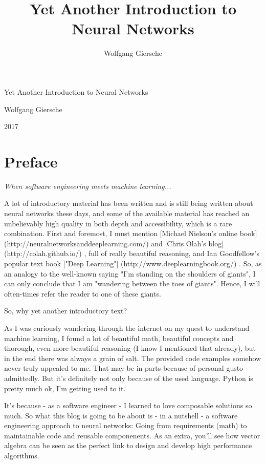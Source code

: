 \documentclass[]{report}
\title{Yet Another Introduction to Neural Networks}
\author{Wolfgang Giersche}
\begin{document}
	
\begin{titlepage}
\Large{Yet Another Introduction to Neural Networks}

\bigskip

Wolfgang Giersche

\bigskip

 2017
\end{titlepage}

\part{Preface}

\emph{When software engineering meets machine learning...}

\bigskip

A lot of introductory material has been written and is still being written about neural networks these days, and some of the available material has reached an unbelievably high quality in both depth and accessibility, which is a rare combination. First and foremost, I must mention [Michael Nielson's online book](http://neuralnetworksanddeeplearning.com/) \cite{nielson2015}
and [Chris Olah's blog](http://colah.github.io/) \cite{olah2015}, full of really beautiful reasoning, and Ian Goodfellow's popular text book ["Deep Learning"] (http://www.deeplearningbook.org/) \cite{goodfellow}. 
So, as an analogy to the well-known saying "I'm standing on the shoulders of giants", I can only conclude that I am "wandering between the toes of giants". Hence, I will often-times refer the reader to one of these giants. 
 
So, why yet another introductory text?

As I was curiously wandering through the internet on my quest to understand machine learning, I found a lot of beautiful math, beautiful concepts and thorough, even more beautiful reasoning (I know I mentioned that already), but in the end there was always a grain of salt. The provided code examples somehow never truly appealed to me. That may be in parts because of personal gusto - admittedly. But it's definitely not only because of the used language. Python is pretty much ok, I'm getting used to it. 

It's because - as a software engineer - I learned to love composable solutions so much. So what this blog is going to be about is - in a nutshell - a software engineering approach to neural networks: Going from requirements (math) to maintainable code and reusable componenents. As an extra, you'll see how vector algebra can be seen as the perfect link to design and develop high performance algorithms.
\end{document}
